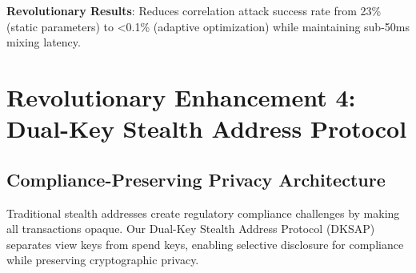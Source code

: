 \documentclass[12pt,a4paper]{article}
\begin{document}
\textbf{Revolutionary Results}: Reduces correlation attack success rate from 23\% (static parameters) to <0.1\% (adaptive optimization) while maintaining sub-50ms mixing latency.

\section{Revolutionary Enhancement 4: Dual-Key Stealth Address Protocol}

\subsection{Compliance-Preserving Privacy Architecture}

Traditional stealth addresses create regulatory compliance challenges by making all transactions opaque. Our Dual-Key Stealth Address Protocol (DKSAP) separates view keys from spend keys, enabling selective disclosure for compliance while preserving cryptographic privacy.
\end{document}
